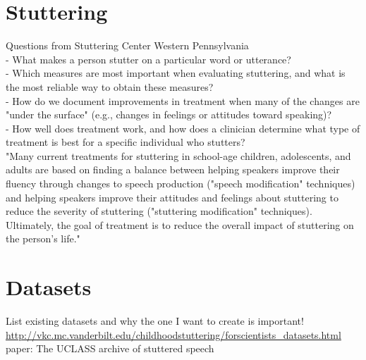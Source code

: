 \section{Stuttering}
Questions from Stuttering Center Western Pennsylvania\\
- What makes a person stutter on a particular word or utterance?\\
- Which measures are most important when evaluating stuttering, and what is the most reliable way to obtain these measures?\\
- How do we document improvements in treatment when many of the changes are "under the surface" (e.g., changes in feelings or attitudes toward speaking)?\\
- How well does treatment work, and how does a clinician determine what type of treatment is best for a specific individual who stutters?\\
"Many current treatments for stuttering in school-age children, adolescents, and adults are based on finding a balance between helping speakers improve their fluency through changes to speech production ("speech modification" techniques) and helping speakers improve their attitudes and feelings about stuttering to reduce the severity of stuttering ("stuttering modification" techniques). Ultimately, the goal of treatment is to reduce the overall impact of stuttering on the person's life."\\




\section{Datasets}

List existing datasets and why the one I want to create is important! \url{http://vkc.mc.vanderbilt.edu/childhoodstuttering/forscientists_datasets.html}\\

paper: The UCLASS archive of stuttered speech\\


